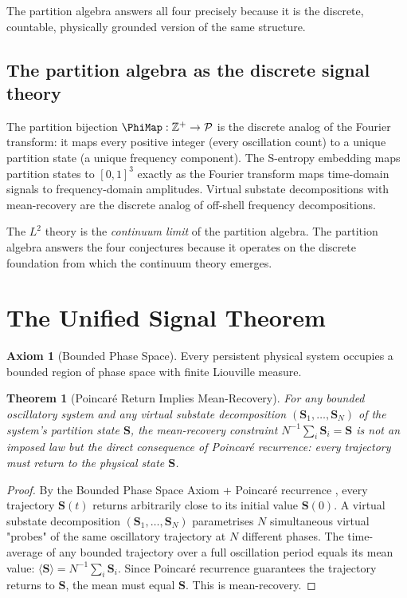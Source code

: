 \documentclass[twocolumn,10pt,a4paper]{article}
\theoremstyle{thmstyle}
\newtheorem{theorem}{Theorem}[section]
\theoremstyle{definition}
\newtheorem{axiom}{Axiom}
\theoremstyle{remark}
\newcommand{\Parts}{\mathcal{P}}
\newcommand{\Sv}{\mathbf{S}}
\begin{document}
The partition algebra answers all four precisely because it is the discrete,
countable, physically grounded version of the same structure.

\subsection{The partition algebra as the discrete signal theory}

The partition bijection $\PhiMap: \mathbb{Z}^+ \to \Parts$ is the
discrete analog of the Fourier transform: it maps every positive integer
(every oscillation count) to a unique partition state (a unique frequency
component).  The S-entropy embedding maps partition states to $[0,1]^3$
exactly as the Fourier transform maps time-domain signals to frequency-domain
amplitudes.  Virtual substate decompositions with mean-recovery are the
discrete analog of off-shell frequency decompositions.

The $L^2$ theory is the \emph{continuum limit} of the partition algebra.
The partition algebra answers the four conjectures because it operates on
the discrete foundation from which the continuum theory emerges.

\section{The Unified Signal Theorem}
\label{sec:unified}

\begin{axiom}[Bounded Phase Space]
Every persistent physical system occupies a bounded region of phase space
with finite Liouville measure.
\end{axiom}

\begin{theorem}[Poincar\'e Return Implies Mean-Recovery]
\label{thm:poincare_mean_recovery}
For any bounded oscillatory system and any virtual substate decomposition
$(\Sv_1,\ldots,\Sv_N)$ of the system's partition state $\Sv$, the
mean-recovery constraint $N^{-1}\sum_i \Sv_i = \Sv$ is not an imposed law
but the direct consequence of Poincar\'e recurrence: every trajectory must
return to the physical state $\Sv$.
\end{theorem}

\begin{proof}
By the Bounded Phase Space Axiom + Poincar\'e recurrence
\citep{poincare1890}, every trajectory $\Sv(t)$ returns arbitrarily close
to its initial value $\Sv(0)$.  A virtual substate decomposition
$(\Sv_1,\ldots,\Sv_N)$ parametrises $N$ simultaneous virtual "probes" of the
same oscillatory trajectory at $N$ different phases.  The time-average of
any bounded trajectory over a full oscillation period equals its mean value:
$\langle\Sv\rangle = N^{-1}\sum_i \Sv_i$.
Since Poincar\'e recurrence guarantees the trajectory returns to $\Sv$,
the mean must equal $\Sv$.  This is mean-recovery.
\end{proof}
\end{document}
